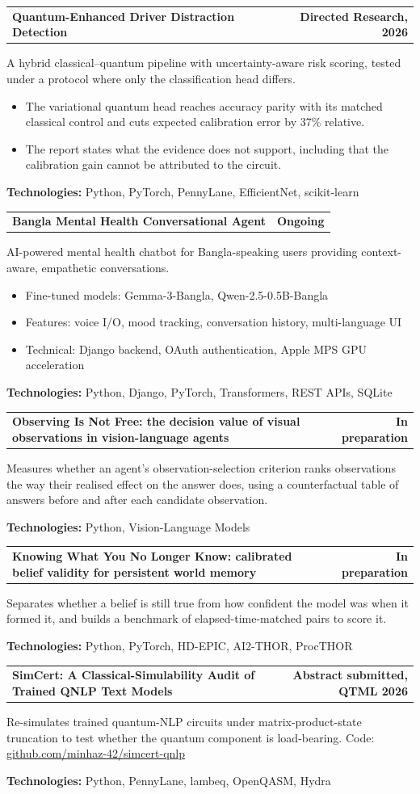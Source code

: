 \documentclass[11pt,letterpaper]{article}
\makeatletter
\newcommand{\entryhead}[2]{\par\vspace{3pt}\noindent%
  \begin{tabular*}{\textwidth}[t]{@{}>{\raggedright\arraybackslash}p{0.73\textwidth}@{\extracolsep{\fill}}r@{}}
    \textbf{#1} & #2
  \end{tabular*}\par\vspace{-1pt}}
\newcommand{\entry}[2]{\entryhead{#1}{\textbf{#2}}}
\newcommand{\tech}[1]{\par\vspace{1pt}\noindent\textbf{Technologies:} #1\par}
\newcommand{\gap}{\par\vspace{3pt}}
\makeatother
\begin{document}
\entry{Quantum-Enhanced Driver Distraction Detection}{Directed Research, 2026}
A hybrid classical--quantum pipeline with uncertainty-aware risk scoring, tested under a protocol
where only the classification head differs.
\begin{itemize}
  \item The variational quantum head reaches accuracy parity with its matched classical control and
    cuts expected calibration error by 37\% relative.
  \item The report states what the evidence does not support, including that the calibration gain
    cannot be attributed to the circuit.
\end{itemize}
\tech{Python, PyTorch, PennyLane, EfficientNet, scikit-learn}
\gap

\entry{Bangla Mental Health Conversational Agent}{Ongoing}
AI-powered mental health chatbot for Bangla-speaking users providing context-aware, empathetic
conversations.
\begin{itemize}
  \item Fine-tuned models: Gemma-3-Bangla, Qwen-2.5-0.5B-Bangla
  \item Features: voice I/O, mood tracking, conversation history, multi-language UI
  \item Technical: Django backend, OAuth authentication, Apple MPS GPU acceleration
\end{itemize}
\tech{Python, Django, PyTorch, Transformers, REST APIs, SQLite}
\gap

\entry{Observing Is Not Free: the decision value of visual observations in vision-language agents}{In preparation}
Measures whether an agent's observation-selection criterion ranks observations the way their
realised effect on the answer does, using a counterfactual table of answers before and after each
candidate observation.
\tech{Python, Vision-Language Models}
\gap

\entry{Knowing What You No Longer Know: calibrated belief validity for persistent world memory}{In preparation}
Separates whether a belief is still true from how confident the model was when it formed it, and
builds a benchmark of elapsed-time-matched pairs to score it.
\tech{Python, PyTorch, HD-EPIC, AI2-THOR, ProcTHOR}
\gap

\entry{SimCert: A Classical-Simulability Audit of Trained QNLP Text Models}{Abstract submitted, QTML 2026}
Re-simulates trained quantum-NLP circuits under matrix-product-state truncation to test whether the
quantum component is load-bearing. Code: \href{https://github.com/minhaz-42/simcert-qnlp}{github.com/minhaz-42/simcert-qnlp}
\tech{Python, PennyLane, lambeq, OpenQASM, Hydra}
\gap
\end{document}
